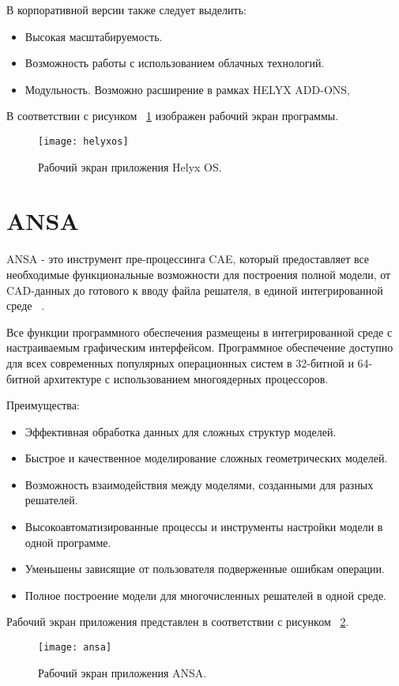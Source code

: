\documentclass[14pt]{extreport}
\begin{document}
В корпоративной версии также следует выделить:
\begin{itemize}
\item Высокая масштабируемость.
\item Возможность работы с использованием облачных технологий.
\item Модульность. Возможно расширение в рамках HELYX ADD-ONS, 
\end{itemize}

В соответствии с рисунком ~\ref{fig2} изображен рабочий экран программы.

\begin{figure}[H]
\centerline{\texttt{[image: helyxos]}}
\caption{Рабочий экран приложения Helyx OS.}
\label{fig2}
\end{figure}

\section{ANSA}
ANSA - это инструмент пре-процессинга CAE, который предоставляет все необходимые функциональные возможности для построения полной модели, от CAD-данных  до готового к вводу файла решателя, в единой интегрированной среде ~\cite{Ansa}.

Все функции программного обеспечения размещены в интегрированной среде с настраиваемым графическим интерфейсом. Программное обеспечение доступно для всех современных популярных операционных систем в 32-битной и 64-битной архитектуре с использованием многоядерных процессоров. 

Преимущества: 
\begin{itemize}
\item Эффективная обработка данных для сложных структур моделей.
\item Быстрое и качественное моделирование сложных геометрических моделей.
\item Возможность взаимодействия между моделями, созданными для разных решателей.
\item Высокоавтоматизированные процессы и инструменты настройки модели в одной программе.
\item Уменьшены зависящие от пользователя подверженные ошибкам операции.
\item Полное построение модели для многочисленных решателей в одной среде.
\end{itemize}
Рабочий экран приложения представлен в соответствии с рисунком ~\ref{fig3}.

\begin{figure}[H]
\centerline{\texttt{[image: ansa]}}
\caption{Рабочий экран приложения ANSA.}
\label{fig3}
\end{figure}
\end{document}

